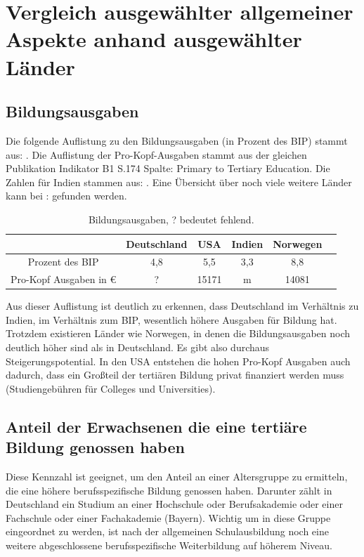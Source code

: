 \section{Vergleich ausgewählter allgemeiner Aspekte anhand ausgewählter Länder}

\subsection*{Bildungsausgaben}
Die folgende Auflistung zu den Bildungsausgaben (in Prozent des BIP) stammt aus: \cite[Indikator B4. S.219]{oecd5}. 
Die Auflistung der Pro-Kopf-Ausgaben stammt aus der gleichen Publikation Indikator B1 S.174 Spalte: Primary to Tertiary Education.
Die Zahlen für Indien stammen aus: \cite[2]{oester}. Eine Übersicht über noch viele weitere Länder kann bei : \cite[165]{hdr} gefunden werden.

\begin{table}[htp]
\begin{tabular}{|c|c|c|c|c|c|}
\hline  	& Deutschland & USA & Indien  & Norwegen \\ 
\hline 	Prozent des BIP &4,8 & 5,5  & 3,3  & 8,8 \\ 
\hline  Pro-Kopf Ausgaben in € & ? & 15171 & m & 14081 \\ 
\hline 
\end{tabular} 
\caption{Bildungsausgaben, ? bedeutet fehlend.}
\end{table}
Aus dieser Auflistung ist deutlich zu erkennen, dass Deutschland im Verhältnis zu Indien, im Verhältnis zum BIP, wesentlich höhere Ausgaben für Bildung hat. Trotzdem existieren Länder wie Norwegen, in denen die Bildungsausgaben noch deutlich höher sind als in Deutschland. Es gibt also durchaus Steigerungspotential. In den USA entstehen die hohen Pro-Kopf Ausgaben auch dadurch, dass ein Großteil der tertiären Bildung privat finanziert werden muss (Studiengebühren für Colleges und Universities). 

\subsection*{Anteil der Erwachsenen die eine tertiäre Bildung genossen haben}
Diese Kennzahl ist geeignet, um den Anteil an einer Altersgruppe zu ermitteln, die eine höhere berufsspezifische Bildung genossen haben. Darunter zählt in Deutschland ein Studium an einer Hochschule oder Berufsakademie oder einer Fachschule oder einer Fachakademie (Bayern). Wichtig um in diese Gruppe eingeordnet zu werden, ist nach der allgemeinen Schulausbildung noch eine weitere abgeschlossene berufsspezifische Weiterbildung auf höherem Niveau.


